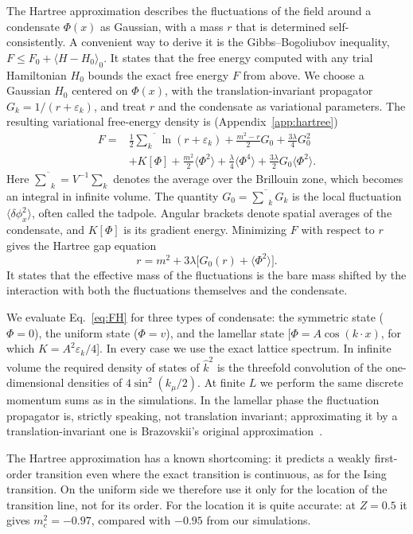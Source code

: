 \documentclass[aps,prd,twocolumn,superscriptaddress,nofootinbib,10pt]{revtex4-2}
\newcommand{\khat}{\widehat{k}^{2}}
\begin{document}
The Hartree approximation describes the fluctuations of the field around a
condensate $\Phi(x)$ as Gaussian, with a mass $r$ that is determined
self-consistently.  A convenient way to derive it is the Gibbs--Bogoliubov
inequality, $F\le F_0+\langle H-H_0\rangle_0$.  It states that the free
energy computed with any trial Hamiltonian $H_0$ bounds the exact free energy
$F$ from above.  We choose a Gaussian $H_0$ centered on $\Phi(x)$, with the
translation-invariant propagator $G_k=1/(r+\varepsilon_k)$, and treat $r$
and the condensate as variational parameters.  The resulting variational
free-energy density is (Appendix~\ref{app:hartree})
\begin{align}
 F={}&\frac12\overline{\sum_k}\ln(r+\varepsilon_k)+\frac{m^2-r}{2}G_0
 +\frac{3\lambda}{4}G_0^2\nonumber\\
 &+K[\Phi]+\frac{m^2}{2}\langle\Phi^2\rangle+\frac{\lambda}{4}\langle\Phi^4\rangle
 +\frac{3\lambda}{2}G_0\langle\Phi^2\rangle.
 \label{eq:FH}
\end{align}
Here $\overline{\sum}_k=V^{-1}\sum_k$ denotes the average over the Brillouin
zone, which becomes an integral in infinite volume.  The quantity
$G_0=\overline{\sum}_kG_k$ is the local fluctuation $\langle\delta\phi_x^2\rangle$,
often called the tadpole.  Angular brackets denote spatial averages of the
condensate, and $K[\Phi]$ is its gradient energy.  Minimizing $F$ with
respect to $r$ gives the Hartree gap equation
\begin{equation}
 r=m^2+3\lambda\bigl[G_0(r)+\langle\Phi^2\rangle\bigr].
 \label{eq:gap}
\end{equation}
It states that the effective mass of the fluctuations is the bare mass
shifted by the interaction with both the fluctuations themselves and the
condensate.

We evaluate Eq.~\eqref{eq:FH} for three types of condensate: the symmetric
state ($\Phi=0$), the uniform state ($\Phi=v$), and the lamellar state
[$\Phi=A\cos(k\cdot x)$, for which $K=A^2\varepsilon_k/4$].  In every case we
use the exact lattice spectrum.  In infinite volume the required density of
states of $\khat$ is the threefold convolution of the one-dimensional
densities of $4\sin^2(k_\mu/2)$.  At finite $L$ we perform the same discrete
momentum sums as in the simulations.  In the lamellar phase the fluctuation
propagator is, strictly speaking, not translation invariant; approximating it
by a translation-invariant one is Brazovskii's original
approximation~\cite{Brazovskii1975}.

The Hartree approximation has a known shortcoming: it predicts a weakly
first-order transition even where the exact transition is continuous, as for
the Ising transition.  On the uniform side we therefore use it only for the
location of the transition line, not for its order.  For the location it is
quite accurate: at $Z=0.5$ it gives $m^2_c=-0.97$, compared with $-0.95$ from
our simulations.
\end{document}

